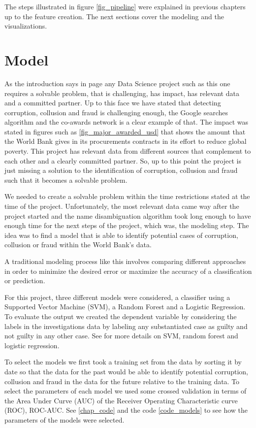 The steps illustrated  in figure \ref{fig_pipeline} were explained in previous chapters up to the feature creation. The next sections cover the modeling and the visualizations.

\section{Model} \label{sec_models}

As the introduction says in page \pageref{dssg} any Data Science project such as this one requires a solvable problem, that is challenging, has impact, has relevant data and a committed partner. Up to this face we have stated that detecting corruption, collusion and fraud  is challenging enough, the Google searches algorithm and the co-awards network is a clear example of that. The impact was stated in figures such as \ref{fig_major_awarded_usd} that shows the amount that the World Bank gives in its procurements contracts in its effort to reduce global poverty. This project has relevant data  from different sources that complement to each other and a clearly committed partner. So, up to this point the project is just missing a solution to the identification of corruption, collusion and fraud such that it becomes a solvable problem.  

We needed to create a solvable problem within the time restrictions stated at the time of the project. Unfortunately, the most relevant data came way after the project started and the name disambiguation algorithm took long enough to have  enough time for the next steps of the project, which was, the modeling step. The idea was to find a model that is able to identify potential cases of corruption, collusion or fraud within the World Bank's data. 

A traditional modeling process like this involves comparing different approaches in order to minimize the desired error or maximize the accuracy of a classification or prediction.


For this project, three different models were considered, a classifier  using a Supported Vector Machine (SVM), a Random Forest and a Logistic Regression. To evaluate the output we created the dependent variable by considering the labels in the investigations data by labeling any substantiated case as guilty and not guilty in any other case. See \cite{hasti} for more details on SVM, random forest and logistic regression. 


To select the models we first took a training set from the data by sorting it by date so that the data for the past would be able to identify potential corruption, collusion and fraud in the data for the future relative to the training data. To select the parameters of each model we used some crossed validation in terms of the Area Under Curve (AUC) of the Receiver Operating Characteristic curve (ROC), ROC-AUC. See \ref{chap_code} and the code \ref{code_models} to see how the parameters of the models were selected.


